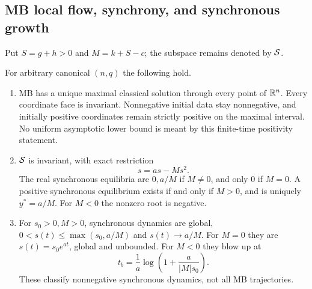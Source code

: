 \subsection{MB local flow, synchrony, and synchronous growth}
\label{slot:P08-1}
Put $S=g+h>0$ and $M=k+S-c$; the subspace remains denoted by $\mathcal{S}$.
\begin{theorem}[MB foundation]
\label{thm:P08-foundation}
For arbitrary canonical $(n,q)$ the following hold.
\begin{enumerate}[label=(\roman*),leftmargin=*]
\item MB has a unique maximal classical solution through every point of
$\mathbb{R}^n$. Every coordinate face is invariant. Nonnegative initial data
stay nonnegative, and initially positive coordinates remain strictly
positive on the maximal interval. No uniform asymptotic lower bound
is meant by this finite-time positivity statement.
\item $\mathcal{S}$ is invariant, with exact restriction
\begin{equation}
 \dot s=as-Ms^2.\label{eq:P08-scalar}
\end{equation}
The real synchronous equilibria are $0,a/M$ if $M\ne0$, and only $0$
if $M=0$. A positive synchronous equilibrium exists if and only if
$M>0$, and is uniquely $y^*=a/M$. For $M<0$ the nonzero root is negative.
\item For $s_0>0,M>0$, synchronous dynamics are global,
$0<s(t)\le\max(s_0,a/M)$ and $s(t)\to a/M$. For $M=0$ they are
$s(t)=s_0e^{at}$, global and unbounded. For $M<0$ they blow up at
\begin{equation}
 t_b=\frac1a\log\left(1+\frac{a}{|M|s_0}\right).
 \label{eq:P08-blowup}
\end{equation}
These classify nonnegative synchronous dynamics, not all MB trajectories.
\end{enumerate}
\end{theorem}
